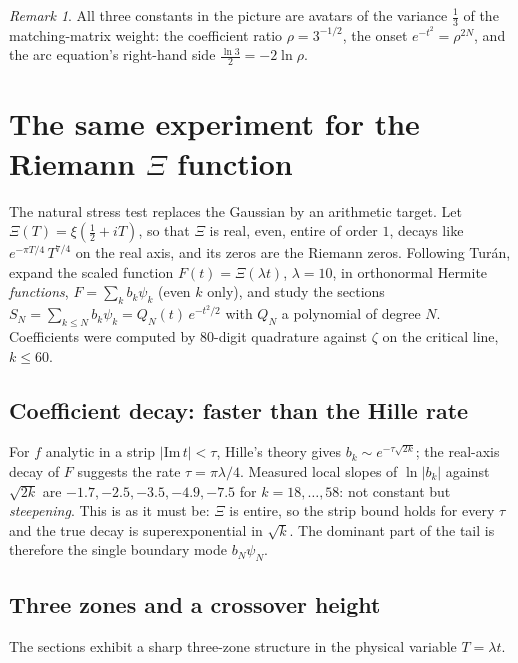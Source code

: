 \documentclass[11pt]{article}
\theoremstyle{remark}
\newtheorem{remark}[theorem]{Remark}
\begin{document}
\begin{remark}
All three constants in the picture are avatars of the variance $\frac13$ of the matching-matrix weight: the coefficient ratio $\rho = 3^{-1/2}$, the onset $e^{-t^2} = \rho^{2N}$, and the arc equation's right-hand side $\frac{\ln 3}{2} = -2\ln\rho$.
\end{remark}

\section{The same experiment for the Riemann $\Xi$ function}

The natural stress test replaces the Gaussian by an arithmetic target. Let $\Xi(T) = \xi(\tfrac12 + iT)$, so that $\Xi$ is real, even, entire of order $1$, decays like $e^{-\pi T/4}\,T^{7/4}$ on the real axis, and its zeros are the Riemann zeros. Following Tur\'an, expand the scaled function $F(t) = \Xi(\lambda t)$, $\lambda = 10$, in orthonormal Hermite \emph{functions}, $F = \sum_k b_k \psi_k$ (even $k$ only), and study the sections $S_N = \sum_{k \le N} b_k \psi_k = Q_N(t)\, e^{-t^2/2}$ with $Q_N$ a polynomial of degree $N$. Coefficients were computed by $80$-digit quadrature against $\zeta$ on the critical line, $k \le 60$.

\subsection{Coefficient decay: faster than the Hille rate}

For $f$ analytic in a strip $|\mathrm{Im}\,t| < \tau$, Hille's theory gives $b_k \sim e^{-\tau\sqrt{2k}}$; the real-axis decay of $F$ suggests the rate $\tau = \pi\lambda/4$. Measured local slopes of $\ln|b_k|$ against $\sqrt{2k}$ are $-1.7, -2.5, -3.5, -4.9, -7.5$ for $k = 18, \dots, 58$: not constant but \emph{steepening}. This is as it must be: $\Xi$ is entire, so the strip bound holds for every $\tau$ and the true decay is superexponential in $\sqrt{k}$. The dominant part of the tail is therefore the single boundary mode $b_N \psi_N$.

\subsection{Three zones and a crossover height}

The sections exhibit a sharp three-zone structure in the physical variable $T = \lambda t$.
\end{document}
